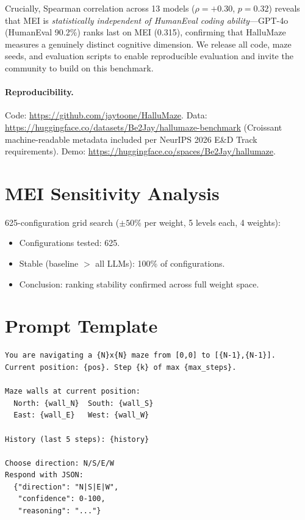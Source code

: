\documentclass{article}
\begin{document}
Crucially, Spearman correlation across 13 models ($\rho{=}{+}0.30$, $p{=}0.32$) reveals that MEI is \emph{statistically independent of HumanEval coding ability}---GPT-4o (HumanEval 90.2\%) ranks last on MEI (0.315), confirming that HalluMaze measures a genuinely distinct cognitive dimension.
We release all code, maze seeds, and evaluation scripts to enable reproducible evaluation and invite the community to build on this benchmark.

\paragraph{Reproducibility.}
Code: \url{https://github.com/jaytoone/HalluMaze}.
Data: \url{https://huggingface.co/datasets/Be2Jay/hallumaze-benchmark} (Croissant machine-readable metadata included per NeurIPS 2026 E\&D Track requirements).
Demo: \url{https://huggingface.co/spaces/Be2Jay/hallumaze}.




\appendix
\section{MEI Sensitivity Analysis}
\label{sec:sensitivity}

625-configuration grid search ($\pm50$\% per weight, 5 levels each, 4 weights):
\begin{itemize}[nosep]
  \item Configurations tested: 625.
  \item Stable (baseline $>$ all LLMs): 100\% of configurations.
  \item Conclusion: ranking stability confirmed across full weight space.
\end{itemize}

\section{Prompt Template}
\label{sec:prompt}

\begin{verbatim}
You are navigating a {N}x{N} maze from [0,0] to [{N-1},{N-1}].
Current position: {pos}. Step {k} of max {max_steps}.

Maze walls at current position:
  North: {wall_N}  South: {wall_S}
  East: {wall_E}   West: {wall_W}

History (last 5 steps): {history}

Choose direction: N/S/E/W
Respond with JSON:
  {"direction": "N|S|E|W",
   "confidence": 0-100,
   "reasoning": "..."}
\end{verbatim}
\end{document}
